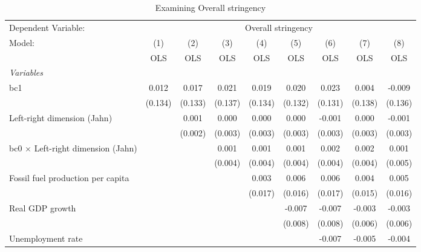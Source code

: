 
\begin{table}[htbp]
   \caption{Examining Overall stringency}
   \centering
   \begin{tabular}{lcccccccc}
      \toprule
      Dependent Variable: & \multicolumn{8}{c}{Overall stringency}\\
      Model:                                    & (1)     & (2)     & (3)     & (4)     & (5)     & (6)     & (7)     & (8)\\  
                                                &  OLS    & OLS     & OLS     & OLS     & OLS     & OLS     & OLS     & OLS\\  
      \midrule
      \emph{Variables}\\
      bc1                                       & 0.012   & 0.017   & 0.021   & 0.019   & 0.020   & 0.023   & 0.004   & -0.009\\   
                                                & (0.134) & (0.133) & (0.137) & (0.134) & (0.132) & (0.131) & (0.138) & (0.136)\\   
      Left-right dimension (Jahn)               &         & 0.001   & 0.000   & 0.000   & 0.000   & -0.001  & 0.000   & -0.001\\   
                                                &         & (0.002) & (0.003) & (0.003) & (0.003) & (0.003) & (0.003) & (0.003)\\   
      bc0 $\times$ Left-right dimension (Jahn)  &         &         & 0.001   & 0.001   & 0.001   & 0.002   & 0.002   & 0.001\\   
                                                &         &         & (0.004) & (0.004) & (0.004) & (0.004) & (0.004) & (0.005)\\   
      Fossil fuel production per capita         &         &         &         & 0.003   & 0.006   & 0.006   & 0.004   & 0.005\\   
                                                &         &         &         & (0.017) & (0.016) & (0.017) & (0.015) & (0.016)\\   
      Real GDP growth                           &         &         &         &         & -0.007  & -0.007  & -0.003  & -0.003\\   
                                                &         &         &         &         & (0.008) & (0.008) & (0.006) & (0.006)\\   
      Unemployment rate                         &         &         &         &         &         & -0.007  & -0.005  & -0.004\\   

\end{tabular}
\end{table}
